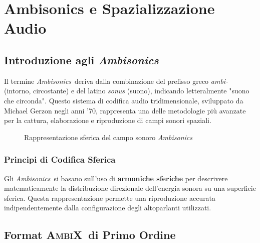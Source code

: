 \documentclass[a4paper,11pt,openany]{book}
\newcommand{\ambisonics}{\textit{Ambisonics}}
\newcommand{\ambix}{\textsc{AmbiX}}
\begin{document}
\chapter{Ambisonics e Spazializzazione Audio}

\section{Introduzione agli \ambisonics}

Il termine \ambisonics\ deriva dalla combinazione del prefisso greco \textit{ambi-} (intorno, circostante) e del latino \textit{sonus} (suono), indicando letteralmente "suono che circonda". Questo sistema di codifica audio tridimensionale, sviluppato da Michael Gerzon negli anni '70, rappresenta una delle metodologie più avanzate per la cattura, elaborazione e riproduzione di campi sonori spaziali.

\begin{figure}[H]
    \centering
    \caption{Rappresentazione sferica del campo sonoro \ambisonics}
    \label{fig:ambisonic_sphere}
\end{figure}

\subsection{Principi di Codifica Sferica}

Gli \ambisonics\ si basano sull'uso di \textbf{armoniche sferiche} per descrivere matematicamente la distribuzione direzionale dell'energia sonora su una superficie sferica. Questa rappresentazione permette una riproduzione accurata indipendentemente dalla configurazione degli altoparlanti utilizzati.

\section{Format \ambix\ di Primo Ordine}
\end{document}
